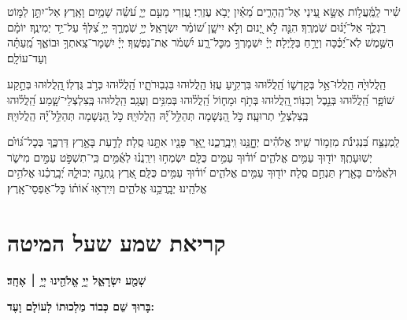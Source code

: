 \documentclass[twoside, openany, parskip=half, 11pt]{book}
\begin{document}
שִׁ֗יר לַֽמַּֽ֫עֲל֥וֹת אֶשָּׂ֣א עֵ֭ינַי אֶל־הֶֽהָרִ֑ים מֵ֝אַ֗יִן יָבֹ֥א עֶזְרִֽי׃ עֶ֭זְרִי מֵעִ֣ם יְיָ֑ עֹ֝שֵׂ֗ה שָׁמַ֥יִם וָאָֽרֶץ׃ אַל־יִתֵּ֣ן לַמּ֣וֹט רַגְלֶ֑ךָ אַל־יָ֝נ֗וּם שֹֽׁמְרֶֽךָ׃ הִנֵּ֤ה לֹ֣א יָ֭נוּם וְלֹ֣א יִישָׁ֑ן שׁ֝וֹמֵ֗ר יִשְׂרָאֵֽל׃ יְיָ֥ שֹֽׁמְרֶ֑ךָ יְיָ֥ צִ֝לְּךָ֗ עַל־יַ֥ד יְמִינֶֽךָ׃ יוֹמָ֗ם הַשֶּׁ֥מֶשׁ לֹֽא־יַ֝כֶּ֗כָּה וְיָרֵ֥חַ בַּלָּֽיְלָה׃ יְיָ֗ יִשְׁמָרְךָ֥ מִכׇּל־רָ֑ע יִ֝שְׁמֹ֗ר אֶת־נַפְשֶֽׁךָ׃ יְיָ֗ יִשְׁמָר־צֵֽאתְךָ֥ וּבוֹאֶ֑ךָ מֵֽ֝עַתָּ֗ה וְעַד־עוֹלָֽם׃

הַֽלֲלוּיָ֙הּ הַֽלֲלוּ־אֵ֥ל בְּקָדְשׁ֑וֹ הַֽ֝לֲל֗וּהוּ בִּרְקִ֥יעַ עֻזּֽוֹ׃
הַֽלֲלוּהוּ בִּגְבֽוּרֹתָ֑יו הַֽ֝לֲל֗וּהוּ כְּרֹ֣ב גֻּדְלֽוֹ׃
֖הַֽלֲלוּהוּ בְּתֵ֣קַע שׁוֹפָ֑ר הַֽ֝לֲל֗וּהוּ בְּנֵ֣בֶל וְכִנּֽוֹר׃
֖הַֽלֲלוּהוּ בְּתֹ֣ף וּמָח֑וֹל הַֽ֝לֲל֗וּהוּ בְּמִנִּ֥ים וְעֻגָֽב׃
הַֽלֲלוּהוּ בְּֽצִלְצְלֵי־שָׁ֑מַע הַֽ֝לֲל֗וּהוּ בְּֽצִלְצְלֵ֥י תְרוּעָֽה׃
כֹּ֣ל הַ֭נְּשָׁמָה תְּהַלֵּ֥ל ֝יָ֗הּ הַֽלֲלוּיָֽהּ׃
כֹּ֣ל הַ֭נְּשָׁמָה תְּהַלֵּ֥ל ֝יָ֗הּ הַֽלֲלוּיָֽהּ׃

\enlargethispage{\baselineskip}
לַֽמְנַצֵּ֥ח
בִּ֝נְגִינֹ֗ת מִזְמ֥וֹר שִֽׁיר׃ אֱלֹהִ֗ים יְחׇׇׇׇנֵּ֥נוּ וִֽיבָֽרֲכֵ֑נוּ יָ֤אֵ֥ר פָּנָ֖יו אִתָּ֣נוּ סֶֽלָה׃ לָדַ֣עַת בָּאָ֣רֶץ דַּרְכֶּ֑ךָ בְּכׇל־גּ֝וֹיִ֗ם יְשֽׁוּעָתֶֽךָ׃ יוֹד֖וּךָ עַמִּ֥ים אֱלֹהִ֑ים י֝וֹד֗וּךָ עַמִּ֥ים כֻּלָּֽם׃ יִשְׂמְח֥וּ וִירַֽנֲנ֗וּ לְאֻ֫מִּ֥ים כִּֽי־תִשְׁפֹּ֣ט עַמִּ֣ים מִישֹׁ֑ר וּלְאֻמִּ֓ים בָּאָ֖רֶץ תַּנְחֵ֣ם סֶֽלָה׃ יוֹד֖וּךָ עַמִּ֥ים אֱלֹהִ֑ים י֝וֹד֗וּךָ עַמִּ֥ים כֻּלָּֽם׃ אֶ֭רֶץ נָֽתְנָ֣ה יְבוּלָ֑הּ יְ֝בָֽרֲכֵ֗נוּ אֱלֹהִ֥ים אֱלֹהֵֽינוּ׃ יְבָֽרֲכֵ֥נוּ אֱלֹהִ֑ים וְיִֽירְא֥וּ א֝וֹת֗וֹ כׇּל־אַפְסֵי־אָֽרֶץ׃


\chapter[קריאת שמע שעל המיטה]{ קריאת שמע שעל המיטה }

\begin{Large}
\textbf{
שְׁמַ֖ע יִשְׂרָאֵ֑ל יְיָ֥ אֱלֹהֵ֖ינוּ יְיָ֥ ׀ אֶחָֽד׃} \\
\end{Large}
\begin{large}
 \textbf{בָּרוּךְ שֵׁם כְּבוֹד מַלְכוּתוֹ לְעוֹלָם וָעֶד:}
\end{large}

\veahavta
\end{document}
